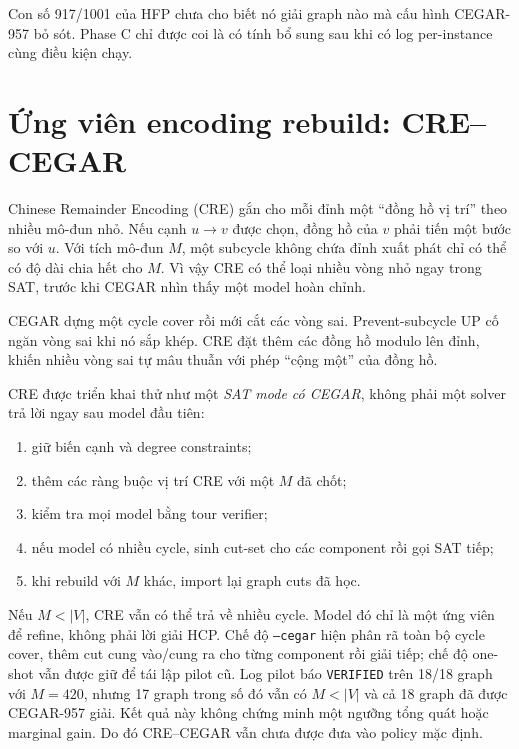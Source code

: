 \documentclass[11pt,a4paper,oneside]{scrreprt}
\newcommand{\code}[1]{\texttt{#1}}
\begin{document}
Con số 917/1001 của HFP chưa cho biết nó giải graph nào mà cấu hình CEGAR-957 bỏ sót. Phase C chỉ được coi là có tính bổ sung sau khi có log per-instance cùng điều kiện chạy.

\section{Ứng viên encoding rebuild: CRE--CEGAR}

Chinese Remainder Encoding (CRE) gắn cho mỗi đỉnh một ``đồng hồ vị trí'' theo nhiều mô-đun nhỏ. Nếu cạnh $u\to v$ được chọn, đồng hồ của $v$ phải tiến một bước so với $u$. Với tích mô-đun $M$, một subcycle không chứa đỉnh xuất phát chỉ có thể có độ dài chia hết cho $M$. Vì vậy CRE có thể loại nhiều vòng nhỏ ngay trong SAT, trước khi CEGAR nhìn thấy một model hoàn chỉnh.

\begin{intuitionbox}
CEGAR dựng một cycle cover rồi mới cắt các vòng sai. Prevent-subcycle UP cố ngăn vòng sai khi nó sắp khép. CRE đặt thêm các đồng hồ modulo lên đỉnh, khiến nhiều vòng sai tự mâu thuẫn với phép ``cộng một'' của đồng hồ.
\end{intuitionbox}

CRE được triển khai thử như một \emph{SAT mode có CEGAR}, không phải một solver trả lời ngay sau model đầu tiên:

\begin{enumerate}
  \item giữ biến cạnh và degree constraints;
  \item thêm các ràng buộc vị trí CRE với một $M$ đã chốt;
  \item kiểm tra mọi model bằng tour verifier;
  \item nếu model có nhiều cycle, sinh cut-set cho các component rồi gọi SAT tiếp;
  \item khi rebuild với $M$ khác, import lại graph cuts đã học.
\end{enumerate}

Nếu $M<|V|$, CRE vẫn có thể trả về nhiều cycle. Model đó chỉ là một ứng viên để refine, không phải lời giải HCP. Chế độ \code{--cegar} hiện phân rã toàn bộ cycle cover, thêm cut cung vào/cung ra cho từng component rồi giải tiếp; chế độ one-shot vẫn được giữ để tái lập pilot cũ. Log pilot báo \code{VERIFIED} trên 18/18 graph với $M=420$, nhưng 17 graph trong số đó vẫn có $M<|V|$ và cả 18 graph đã được CEGAR-957 giải. Kết quả này không chứng minh một ngưỡng tổng quát hoặc marginal gain. Do đó CRE--CEGAR vẫn chưa được đưa vào policy mặc định.
\end{document}
